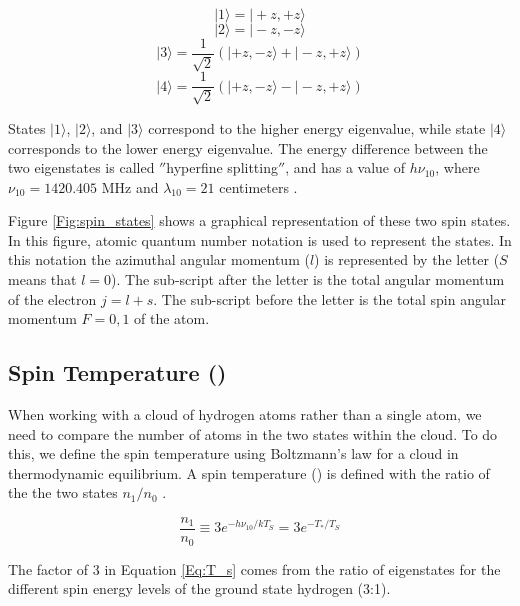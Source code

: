 \begin{equation}
| 1 \rangle = | + z , + z \rangle 
\end{equation}
\begin{equation}
| 2 \rangle = | - z, - z \rangle 
\end{equation}
\begin{equation}
| 3 \rangle = \frac{1}{\sqrt{2}} (| + z, - z \rangle + |-z, +z \rangle) 
\end{equation}
\begin{equation}
| 4 \rangle = \frac{1}{\sqrt{2}} (| + z, - z \rangle - |-z, +z \rangle)
\end{equation}


States $| 1 \rangle$, $| 2 \rangle$, and $| 3 \rangle$ correspond to the higher energy eigenvalue, while state $| 4 \rangle$ corresponds to the lower energy eigenvalue. The energy difference between the two eigenstates is called $''$hyperfine splitting$''$, and has a value of $h \nu_{10}$, where $\nu_{10}=1420.405$ MHz and $\lambda_{10} =  21$ centimeters \cite{townsend2000}. 

Figure \ref{Fig:spin_states} shows a graphical representation of these two spin states. In this figure, atomic quantum number notation is used to represent the states. In this notation the azimuthal angular momentum ($l$) is represented by the letter ($S$ means that $l=0$). The sub-script after the letter is the total angular momentum of the electron $j=l+s$. The sub-script before the letter is the total spin angular momentum $F=0,1$ of the atom. 

\subsection{Spin Temperature (\ts)}
When working with a cloud of hydrogen atoms rather than a single atom, we need to compare the number of atoms in the two states within the cloud. To do this, we define the spin temperature using Boltzmann's law for a cloud in thermodynamic equilibrium. A spin temperature (\ts) is defined with the ratio of the the two states $n_1/n_0$ \cite{field_1958}. 

\begin{equation}\label{Eq:T_s}
\frac{n_1}{n_0} \equiv 3 e^{- h \nu_{10} / kT_S} = 3 e^{-T_*/T_S}
\end{equation} 

The factor of 3 in Equation \ref{Eq:T_s} comes from the ratio of eigenstates for the different spin energy levels of the ground state hydrogen (3:1). 

